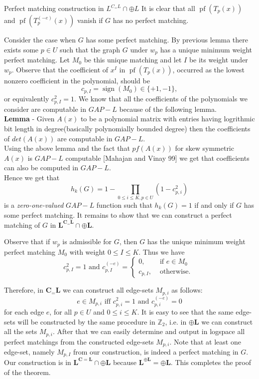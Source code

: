 \documentclass{beamer}
\begin{document}
\begin{frame}[allowframebreaks]{Perfect matching construction in $L^{C_=L} \cap \oplus L$}
	It is clear that all $\operatorname{pf}\left(T_p(x)\right)$ and $\operatorname{pf}\left(T_p^{(-e)}(x)\right)$ vanish if $G$ has no perfect matching.
	
	Consider the case when $G$ has some perfect matching. By previous lemma there exists some $p \in U$ such that the graph $G$ under $w_p$ has a unique minimum weight perfect matching. Let $M_0$ be this unique matching and let $I$ be its weight under $w_p$. Observe that the coefficient of $x^I$ in $\operatorname{pf}\left(T_p(x)\right)$, occurred as the lowest nonzero coefficient in the polynomial, should be
	$$
	c_{p, I}=\operatorname{sign}\left(M_0\right) \in\{+1,-1\},
	$$
	or equivalently $c_{p, I}^2=1$. We know that all the coefficients of the polynomials we consider are computable in $GAP-L$ because of the following lemma.\\
	\textbf{Lemma} - Given $A(x)$ to be a polynomial matrix with entries having logrithmic bit length in degree(basically polynomially bounded degree) then the coefficients of $det(A(x))$ are computable in $GAP-L$.
	\\
	Using the above lemma and the fact that $pf(A(x))$ for skew symmetric $A(x)$ is $GAP-L$ computable [Mahajan and Vinay 99] we get that coefficients can also be computed in $GAP-L$.\\
	 Hence we get that $$h_k(G)= 1 - \prod_{0\leq i \leq K, p \in U} (1-c^{2}_{p,i})$$
	is a \textit{zero-one-valued} $GAP-L$ function such that $h_k(G)=1$ if and only if $G$ has some perfect matching.
	It remains to show that we can construct a perfect matching of $G$ in $\mathbf{L}^{\mathbf{C}_{=} \mathbf{L}} \cap \oplus \mathbf{L}$.
	
	Observe that if $w_p$ is admissible for $G$, then $G$ has the unique minimum weight perfect matching $M_0$ with weight $0 \leq I \leq K$. Thus we have
	$$
	c_{p, I}^2=1 \text { and } c_{p, I}^{(-e)}=\left\{\begin{array}{cl}
		0, & \text { if } e \in M_0 \\
		c_{p, I}, & \text { otherwise. }
	\end{array}\right.
	$$
	
	Therefore, in $\mathbf{C}_{=} \mathbf{L}$ we can construct all edge-sets $M_{p, i}$ as follows:
	$$
	e \in M_{p, i} \text { iff } c_{p, i}^2=1 \text { and } c_{p, i}^{(-e)}=0
	$$
	for each edge $e$, for all $p \in U$ and $0 \leq i \leq K$.
	It is easy to see that the same edge-sets will be constructed by the same procedure in $\mathbb{Z}_2$, i.e. in $\oplus \mathbf{L}$ we can construct all the sets $M_{p, i}$. After that we can easily determine and output in logspace all perfect matchings from the constructed edge-sets $M_{p, i}$. Note that at least one edge-set, namely $M_{p, I}$ from our construction, is indeed a perfect matching in $G$. Our construction is in $\mathbf{L}^{\mathbf{C}=\mathbf{L}} \cap \oplus \mathbf{L}$ because $\mathbf{L}^{\oplus \mathbf{L}}=\oplus \mathbf{L}$. This completes the proof of the theorem.
	
\end{frame}
\end{document}
